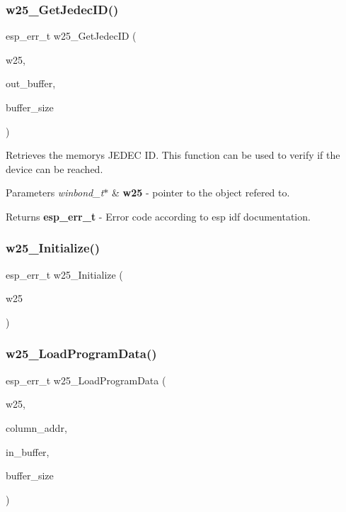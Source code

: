 \subsubsection{w25\+\_\+\+Get\+Jedec\+I\+D()}
{\footnotesize\ttfamily esp\+\_\+err\+\_\+t w25\+\_\+\+Get\+Jedec\+ID (\begin{DoxyParamCaption}\item[{const \textbf{ winbond\+\_\+t} $\ast$}]{w25,  }\item[{uint8\+\_\+t $\ast$}]{out\+\_\+buffer,  }\item[{size\+\_\+t}]{buffer\+\_\+size }\end{DoxyParamCaption})}

Retrieves the memory\textquotesingle{}s J\+E\+D\+EC ID. This function can be used to verify if the device can be reached. 
\begin{DoxyParams}{Parameters}
{\em winbond\+\_\+t$\ast$} & {\bfseries w25} -\/ pointer to the object refered to. \\
\hline
\end{DoxyParams}
\begin{DoxyReturn}{Returns}
{\bfseries esp\+\_\+err\+\_\+t} -\/ Error code according to esp idf documentation. 
\end{DoxyReturn}
\mbox{\label{_w25_n01_g_v_8h_a1eda1a8b962fdbe6cd545175f0d7cdd5}} 
\subsubsection{w25\+\_\+\+Initialize()}
{\footnotesize\ttfamily esp\+\_\+err\+\_\+t w25\+\_\+\+Initialize (\begin{DoxyParamCaption}\item[{const \textbf{ winbond\+\_\+t} $\ast$}]{w25 }\end{DoxyParamCaption})}

\mbox{\label{_w25_n01_g_v_8h_a49f2aebfa2081217e22c18b7d141d7d0}} 
\subsubsection{w25\+\_\+\+Load\+Program\+Data()}
{\footnotesize\ttfamily esp\+\_\+err\+\_\+t w25\+\_\+\+Load\+Program\+Data (\begin{DoxyParamCaption}\item[{const \textbf{ winbond\+\_\+t} $\ast$}]{w25,  }\item[{uint16\+\_\+t}]{column\+\_\+addr,  }\item[{const uint8\+\_\+t $\ast$}]{in\+\_\+buffer,  }\item[{size\+\_\+t}]{buffer\+\_\+size }\end{DoxyParamCaption})}

